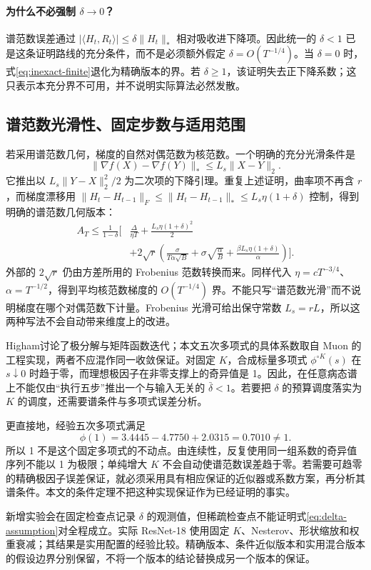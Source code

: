 \paragraph{为什么不必强制 $\delta\to0$？}
谱范数误差通过 $|\langle H_t,R_t\rangle|\leq\delta\|H_t\|_*$ 相对吸收进下降项。因此统一的 $\delta<1$ 已是这条证明路线的充分条件，而不是必须额外假定 $\delta=O(T^{-1/4})$。当 $\delta=0$ 时，式\eqref{eq:inexact-finite}退化为精确版本的界。若 $\delta\geq1$，该证明失去正下降系数；这只表示本充分界不可用，并不说明实际算法必然发散。

\subsection{谱范数光滑性、固定步数与适用范围}
若采用谱范数几何，梯度的自然对偶范数为核范数。一个明确的充分光滑条件是
\begin{equation}\label{eq:spectral-smooth}
 \|\nabla f(X)-\nabla f(Y)\|_*\leq L_s\|X-Y\|_2.
\end{equation}
它推出以 $L_s\|Y-X\|_2^2/2$ 为二次项的下降引理。重复上述证明，曲率项不再含 $r$，而梯度漂移用 $\|H_t-H_{t-1}\|_F\leq\|H_t-H_{t-1}\|_*\leq L_s\eta(1+\delta)$ 控制，得到明确的谱范数几何版本：
\begin{equation}\label{eq:spectral-inexact-finite}
\begin{aligned}
 A_T\leq\frac1{1-\delta}\biggl[&\frac\Delta{\eta T}+\frac{L_s\eta(1+\delta)^2}{2}\\
 &+2\sqrt r\left(\frac\sigma{T\alpha\sqrt B}+\sigma\sqrt{\frac\alpha B}
 +\frac{\beta L_s\eta(1+\delta)}\alpha\right)\biggr].
\end{aligned}
\end{equation}
外部的 $2\sqrt r$ 仍由方差所用的 Frobenius 范数转换而来。同样代入 $\eta=cT^{-3/4}$、$\alpha=T^{-1/2}$，得到平均核范数梯度的 $O(T^{-1/4})$ 界。不能只写“谱范数光滑”而不说明梯度在哪个对偶范数下计量。Frobenius 光滑可给出保守常数 $L_s=rL$，所以这两种写法不会自动带来维度上的改进。

Higham\citep{higham2008}讨论了极分解与矩阵函数迭代；本文五次多项式的具体系数取自 Muon 的工程实现\citep{jordan2024}，两者不应混作同一收敛保证。对固定 $K$，合成标量多项式 $\phi^{\circ K}(s)$ 在 $s\downarrow0$ 时趋于零，而理想极因子在非零支撑上的奇异值是 1。因此，在任意病态谱上不能仅由“执行五步”推出一个与输入无关的 $\bar\delta<1$。若要把 $\delta$ 的预算调度落实为 $K$ 的调度，还需要谱条件与多项式误差分析。

更直接地，经验五次多项式满足
\begin{equation}
 \phi(1)=3.4445-4.7750+2.0315=0.7010\ne1.
\end{equation}
所以 1 不是这个固定多项式的不动点。由连续性，反复使用同一组系数的奇异值序列不能以 1 为极限；单纯增大 $K$ 不会自动使谱范数误差趋于零。若需要可趋零的精确极因子误差保证，就必须采用具有相应保证的近似器或系数方案，再分析其谱条件。本文的条件定理不把这种实现保证作为已经证明的事实。

新增实验会在固定检查点记录 $\delta$ 的观测值，但稀疏检查点不能证明式\eqref{eq:delta-assumption}对全程成立。实际 ResNet-18 使用固定 $K$、Nesterov、形状缩放和权重衰减；其结果是实用配置的经验比较。精确版本、条件近似版本和实用混合版本的假设边界分别保留，不将一个版本的结论替换成另一个版本的保证。
